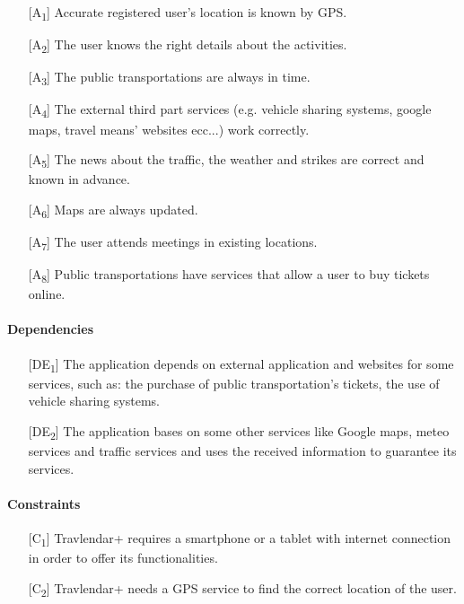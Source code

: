 \documentclass[12pt,titlepage]{article}
\begin{document}
\begin{itemize}
\item [{[A\textsubscript{1}]}]  Accurate registered user's location is known by GPS.
\item [{[A\textsubscript{2}]}] The user knows the right details about the activities.
\item [{[A\textsubscript{3}]}] The public transportations are always in time.
\item [{[A\textsubscript{4}]}] The external third part services (e.g. vehicle sharing systems, google maps, travel means' websites ecc...) work correctly.
\item [{[A\textsubscript{5}]}] The news about the traffic, the weather and strikes are correct and known in advance. 
\item [{[A\textsubscript{6}]}] Maps are always updated. 
\item [{[A\textsubscript{7}]}] The user attends meetings in existing locations. 
\item [{[A\textsubscript{8}]}] Public transportations have services that allow a user to buy tickets online. 
\end{itemize} 


\paragraph{Dependencies}
\begin{itemize}
\item[{[DE\textsubscript{1}]}]  The application depends on external application and websites for some services, such as: the purchase of public transportation's tickets, the use of vehicle sharing systems. 
\item [{[DE\textsubscript{2}]}] The application bases on some other services like Google maps, meteo services and traffic services and uses the received information to guarantee its services.
\end{itemize}

\paragraph{Constraints}
\begin{itemize}
\item [{[C\textsubscript{1}]}] Travlendar+ requires a smartphone or a tablet with internet connection in order to offer its functionalities.
\item [{[C\textsubscript{2}]}] Travlendar+ needs a GPS service to find the correct location of the user.

\end{itemize}
\end{document}
